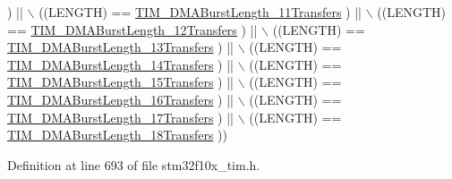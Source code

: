 \begin{DoxyCode}
      ) || \(\backslash\)
                                   ((LENGTH) == \hyperlink{group___t_i_m___d_m_a___burst___length_ga0ca63a3caeaf1e85bd54961891949de7}{TIM\_DMABurstLength\_11Transfers}
      ) || \(\backslash\)
                                   ((LENGTH) == \hyperlink{group___t_i_m___d_m_a___burst___length_ga9160d52913bbd7ad1e663ff943d01852}{TIM\_DMABurstLength\_12Transfers}
      ) || \(\backslash\)
                                   ((LENGTH) == \hyperlink{group___t_i_m___d_m_a___burst___length_ga11485e9eee8a6a7edc1df868755eab85}{TIM\_DMABurstLength\_13Transfers}
      ) || \(\backslash\)
                                   ((LENGTH) == \hyperlink{group___t_i_m___d_m_a___burst___length_gab1a097ca7404e518839df99795443fb0}{TIM\_DMABurstLength\_14Transfers}
      ) || \(\backslash\)
                                   ((LENGTH) == \hyperlink{group___t_i_m___d_m_a___burst___length_gad13373f5fd246557a4fc487dc43c37ec}{TIM\_DMABurstLength\_15Transfers}
      ) || \(\backslash\)
                                   ((LENGTH) == \hyperlink{group___t_i_m___d_m_a___burst___length_gafb644e6033f7b46c602b02754b69fde0}{TIM\_DMABurstLength\_16Transfers}
      ) || \(\backslash\)
                                   ((LENGTH) == \hyperlink{group___t_i_m___d_m_a___burst___length_ga5b2c97f650a3c1726965187d852b8cc5}{TIM\_DMABurstLength\_17Transfers}
      ) || \(\backslash\)
                                   ((LENGTH) == \hyperlink{group___t_i_m___d_m_a___burst___length_gaed9f2afef174079f6eb6927abd995b9b}{TIM\_DMABurstLength\_18Transfers}
      ))
\end{DoxyCode}


Definition at line 693 of file stm32f10x\+\_\+tim.\+h.

